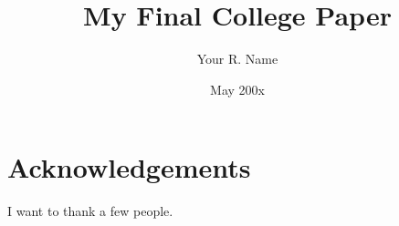 
\title{My Final College Paper}
\author{Your R. Name}
\date{May 200x}






  \maketitle
  \frontmatter %
  \pagestyle{empty} %

    \chapter*{Acknowledgements}
	I want to thank a few people.

	
	


	

